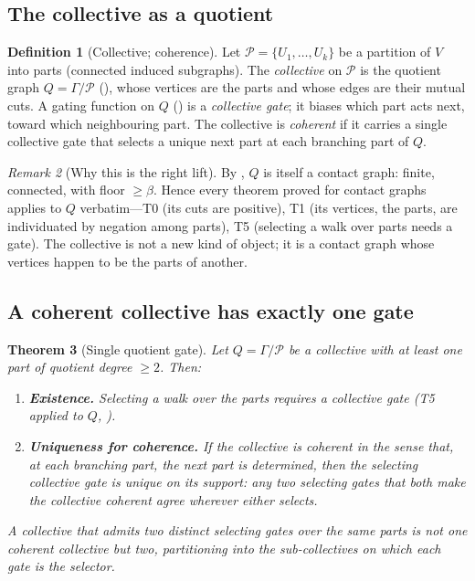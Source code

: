\documentclass[11pt,a4paper]{article}
\theoremstyle{thmstyle}
\newtheorem{theorem}{Theorem}[section]
\theoremstyle{definition}
\newtheorem{definition}[theorem]{Definition}
\theoremstyle{remark}
\newtheorem{remark}[theorem]{Remark}
\newcommand{\Gph}{\Gamma}                 %
\newcommand{\V}{V}                        %
\newcommand{\floorc}{\beta}               %
\newcommand{\Quot}{Q}                     %
\begin{document}
\subsection{The collective as a quotient}

\begin{definition}[Collective; coherence]
\label{def:collective}
Let $\mathcal{P}=\{U_1,\dots,U_k\}$ be a partition of $\V$ into parts (connected
induced subgraphs). The \emph{collective} on $\mathcal{P}$ is the quotient graph
$\Quot=\Gph/\mathcal{P}$ (), whose vertices are the parts and
whose edges are their mutual cuts. A gating function on $\Quot$
() is a \emph{collective gate}; it biases which part acts next,
toward which neighbouring part. The collective is \emph{coherent} if it carries a
single collective gate that selects a unique next part at each branching part of
$\Quot$.
\end{definition}

\begin{remark}[Why this is the right lift]
\label{rem:lift}
By , $\Quot$ is itself a contact graph: finite,
connected, with floor $\ge\floorc$. Hence every theorem proved for contact graphs
applies to $\Quot$ verbatim---T0 (its cuts are positive), T1 (its vertices, the
parts, are individuated by negation among parts), T5 (selecting a walk over parts
needs a gate). The collective is not a new kind of object; it is a contact graph
whose vertices happen to be the parts of another.
\end{remark}

\subsection{A coherent collective has exactly one gate}

\begin{theorem}[Single quotient gate]
\label{thm:single-gate}
Let $\Quot=\Gph/\mathcal{P}$ be a collective with at least one part of quotient
degree $\ge2$. Then:
\begin{enumerate}[label=\textup{(\roman*)},leftmargin=2.2em]
\item \textbf{Existence.} Selecting a walk over the parts requires a collective
gate \textup{(}T5 applied to $\Quot$, \textup{)}.
\item \textbf{Uniqueness for coherence.} If the collective is coherent in the
sense that, at each branching part, the next part is determined, then the
selecting collective gate is unique on its support: any two selecting gates that
both make the collective coherent agree wherever either selects.
\end{enumerate}
A collective that admits two distinct selecting gates over the same parts is not
one coherent collective but two, partitioning into the sub-collectives on which
each gate is the selector.
\end{theorem}
\end{document}

